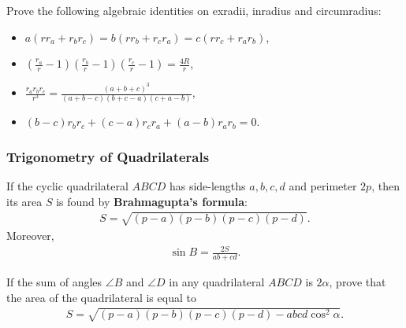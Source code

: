 \documentclass[12pt,a4paper]{memoir}
\theoremstyle{definition}
\begin{document}
	\begin{question}[name=Algebraic Identities on Radii]
		Prove the following algebraic identities on exradii, inradius and circumradius:
		\begin{itemize}
			\item $a(rr_a+r_br_c)=b(rr_b+r_cr_a)=c(rr_c+r_ar_b)$,
			\item $\displaystyle \left(\frac{r_a}{r}-1\right)\left(\frac{r_b}{r}-1\right)\left(\frac{r_c}{r}-1\right)=\frac{4R}{r}$,
			\item $\displaystyle \frac{r_ar_br_c}{r^3} = \frac{(a+b+c)^3}{(a+b-c)(b+c-a)(c+a-b)}$,
			\item $(b-c)r_br_c+(c-a)r_cr_a+(a-b)r_ar_b=0$.
		\end{itemize}
	\end{question}



\subsubsection{Trigonometry of Quadrilaterals}


	\begin{question}[name={Brahmagupta's Formula on Area of Cyclic Quadrilaterals}]
		If the cyclic quadrilateral $ABCD$ has side-lengths $a,b,c,d$ and perimeter $2p$, then its area $S$ is found by \textbf{Brahmagupta’s formula}:
		\begin{align*}
			S = \sqrt{(p-a)(p-b)(p-c)(p-d)}.
		\end{align*}
		Moreover,
		\begin{align*}
			\sin B = \frac{2S}{ab+cd}.
		\end{align*}
	\end{question}
	
	\begin{question}[name={Generalized Brahmagupta's Formula}]
		If the sum of angles $\angle B$ and $\angle D$ in any quadrilateral $ABCD$ is $2\alpha$, prove that the area of the quadrilateral is equal to
		\begin{align*}
			S = \sqrt{(p-a)(p-b)(p-c)(p-d)-abcd\cos^2\alpha}.
		\end{align*}
	\end{question}
	
\end{document}
